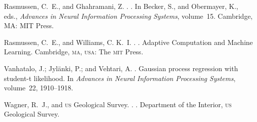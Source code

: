 \documentclass[letterpaper]{article}
\begin{document}
\begin{thebibliography}{}
Rasmussen, C.~E., and Ghahramani, Z.
.
.
\newblock In Becker, S., and Obermayer, K., eds., {\em Advances in Neural
  Information Processing Systems}, volume~15. Cambridge, MA: MIT Press.

Rasmussen, C.~E., and Williams, C. K.~I.
.
.
\newblock Adaptive Computation and Machine Learning. Cambridge, {\scshape ma},
  {\scshape usa}: The {\scshape mit} Press.

Vanhatalo, J.; Jyl{\"a}nki, P.; and Vehtari, A.
.
\newblock Gaussian process regression with student-t likelihood.
\newblock In {\em Advances in Neural Information Processing Systems},
  volume~22,  1910--1918.

Wagner, R.~J., and {{\scshape us} Geological Survey}.
.
.
 Department of the Interior, {\scshape us} Geological
  Survey.

\end{thebibliography}
\end{document}
